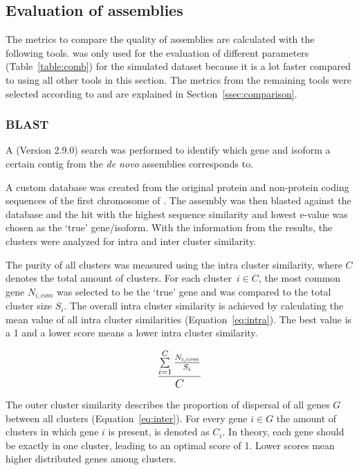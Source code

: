 \documentclass[12pt,a4paper,english]{article}
\begin{document}
\subsection{Evaluation of assemblies}
	\label{ssec:evaluation}
	The metrics to compare the quality of assemblies are calculated with the following tools. 
	\blast was only used for the evaluation of different parameters (Table~\ref{table:comb}) for the simulated dataset because it is a lot faster compared to using all other tools in this section.
	The metrics from the remaining tools were selected according to \citet{hoelzer:19} and are explained in Section~\ref{ssec:comparison}.

\subsubsection*{BLAST}
	A \blast (Version 2.9.0) \citep{blast:90} search was performed to identify which gene and isoform a certain contig from the \textit{de novo} assemblies corresponds to.
	
	A custom database was created from the original protein and non-protein coding sequences of the first chromosome of \celegans.
	The assembly was then blasted against the database and the hit with the highest sequence similarity and lowest e-value was chosen as the `true' gene/isoform. With the information from the \blast results, the clusters were analyzed for intra and inter cluster similarity.
	
	The purity of all clusters was measured using the intra cluster similarity, where $ C $ denotes the total amount of clusters. For each cluster~$ i \in C $, the most common gene $ N_{i, com} $ was selected to be the `true' gene and was compared to the total cluster size $ S_{i} $. The overall intra cluster similarity is achieved by calculating the mean value of all intra cluster similarities (Equation~\ref{eq:intra}). The best value is a 1 and a lower score means a lower intra cluster similarity.
	
	\begin{equation}
	\label{eq:intra}
	\mathlarger{\frac{\sum\limits_{i=1}^{C}\frac{N_{i, com}}{S_{i}}}{C} }
	\end{equation}
	
	The outer cluster similarity describes the proportion of dispersal of all genes $G$ between all clusters (Equation~\ref{eq:inter}). For every gene $i \in G$ the amount of clusters in which gene $i$ is present, is denoted as $ C_{i} $. In theory, each gene should be exactly in one cluster, leading to an optimal score of 1. Lower scores mean higher distributed genes among clusters.
\end{document}
